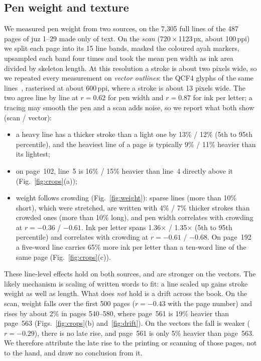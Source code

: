 \documentclass[sigconf,nonacm]{acmart}
\newcommand{\x}{\ensuremath{\times}}
\begin{document}
\subsection{Pen weight and texture}\label{sec:pen}
We measured pen weight from two sources, on the 7{,}305 full lines of the 487 pages of juz 1--29 made only of text. On the \emph{scan} (720\,\x\,1123\,px, about 100\,ppi) we split each page into its 15 line bands, masked the coloured ayah markers, upsampled each band four times and took the mean pen width as ink area divided by skeleton length. At this resolution a stroke is about two pixels wide, so we repeated every measurement on \emph{vector outlines}: the QCF4 glyphs of the same lines~\cite{qcf4}, rasterised at about 600\,ppi, where a stroke is about 13 pixels wide. The two agree line by line at $r=0.62$ for pen width and $r=0.87$ for ink per letter; a tracing may smooth the pen and a scan adds noise, so we report what both show (scan / vector):
\begin{itemize}
  \item a heavy line has a thicker stroke than a light one by 13\% / 12\% (5th to 95th percentile), and the heaviest line of a page is typically 9\% / 11\% heavier than its lightest;
  \item on page~102, line~5 is 16\% / 15\% heavier than line~4 directly above it (Fig.~\ref{fig:crops}(a));
  \item weight follows crowding (Fig.~\ref{fig:weight}): sparse lines (more than 10\% short), which were stretched, are written with 4\% / 7\% thicker strokes than crowded ones (more than 10\% long), and pen width correlates with crowding at $r=-0.36$ / $-0.61$. Ink per letter spans 1.36\x{} / 1.35\x{} (5th to 95th percentile) and correlates with crowding at $r=-0.61$ / $-0.68$. On page~192 a five-word line carries 65\% more ink per letter than a ten-word line of the same page (Fig.~\ref{fig:crops}(c)).
\end{itemize}
These line-level effects hold on both sources, and are stronger on the vectors. The likely mechanism is scaling of written words to fit: a line scaled up gains stroke weight as well as length. What does \emph{not} hold is a drift across the book. On the scan, weight falls over the first 500 pages ($r=-0.43$ with the page number) and rises by about 2\% in pages 540--580, where page~561 is 19\% heavier than page~563 (Figs.~\ref{fig:crops}(b) and~\ref{fig:drift}). On the vectors the fall is weaker ($r=-0.29$), there is no late rise, and page~561 is only 5\% heavier than page~563. We therefore attribute the late rise to the printing or scanning of those pages, not to the hand, and draw no conclusion from it.
\end{document}
